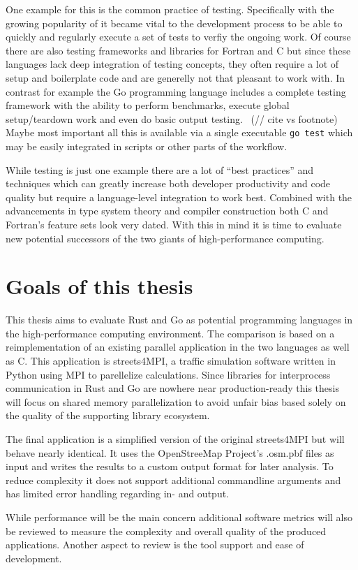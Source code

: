 One example for this is the common practice of testing. Specifically with the growing popularity of  it became vital to the development process to be able to quickly and regularly execute a set of tests to verfiy the ongoing work. Of course there are also testing frameworks and libraries for Fortran and C but since these languages lack deep integration of testing concepts, they often require a lot of setup and boilerplate code and are generelly not that pleasant to work with. In contrast for example the Go programming language includes a complete testing framework with the ability to perform benchmarks, execute global setup/teardown work and even do basic output testing.~\cite{GO_TEST} (// cite vs footnote) Maybe most important all this is available via a single executable \lstinline$go test$ which may be easily integrated in scripts or other parts of the workflow.

While testing is just one example there are a lot of ``best practices'' and techniques which can greatly increase both developer productivity and code quality but require a language-level integration to work best. Combined with the advancements in type system theory and compiler construction both C and Fortran's feature sets look very dated. With this in mind it is time to evaluate new potential successors of the two giants of high-performance computing.

\section{Goals of this thesis}
\label{sec:Introduction::Goals}

This thesis aims to evaluate Rust and Go as potential programming languages in the high-performance computing environment. The comparison is based on a reimplementation of an existing parallel application in the two languages as well as C. This application is streets4MPI, a traffic simulation software written in Python using MPI to parellelize calculations. Since libraries for interprocess communication in Rust and Go are nowhere near production-ready this thesis will focus on shared memory parallelization to avoid unfair bias based solely on the quality of the supporting library ecosystem.

The final application is a simplified version of the original streets4MPI but will behave nearly identical. It uses the OpenStreeMap Project's .osm.pbf files as input and writes the results to a custom output format for later analysis. To reduce complexity it does not support additional commandline arguments and has limited error handling regarding in- and output.

While performance will be the main concern additional software metrics will also be reviewed to measure the complexity and overall quality of the produced applications. Another aspect to review is the tool support and ease of development.

